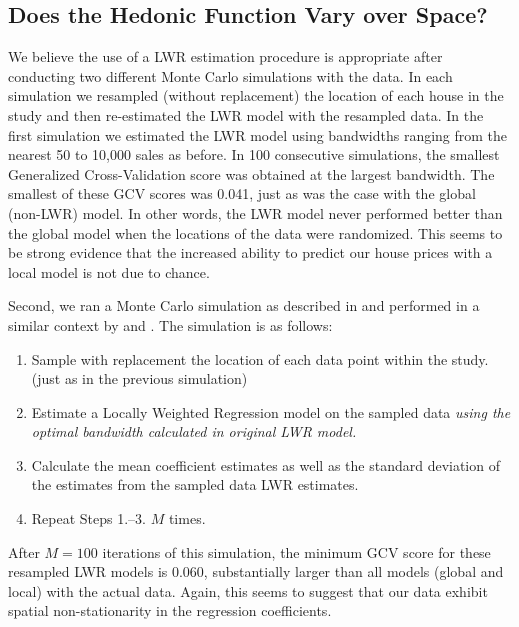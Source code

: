 \documentclass{article}\usepackage{graphicx, color}
\begin{document}
\subsection{Does the Hedonic Function Vary over Space?}


We believe the use of a LWR estimation procedure is appropriate after conducting two different Monte Carlo simulations with the data. In each simulation we resampled (without replacement) the location of each house in the study and then re-estimated the LWR model with the resampled data. In the first simulation we estimated the LWR model using bandwidths ranging from the nearest 50 to 10,000 sales as before. In 100 consecutive simulations, the smallest Generalized Cross-Validation score was obtained at the largest bandwidth. The smallest of these GCV scores was 0.041, just as was the case with the global (non-LWR) model. In other words, the LWR model never performed better than the global model when the locations of the data were randomized. This seems to be strong evidence that the increased ability to predict our house prices with a local model is not due to chance. 

Second, we ran a Monte Carlo simulation as described in \citet{Fotheringham2002} and performed in a similar context by \citet{MarmolejoDuarteCarlos;GonzalezTamez2009} and \citet{Cho2009}. The simulation is as follows:
\begin{enumerate}
\item Sample with replacement the location of each data point within the study. (just as in the previous simulation)
\item Estimate a Locally Weighted Regression model on the sampled data \emph{using the optimal bandwidth calculated in original LWR model.}
\item Calculate the mean coefficient estimates as well as the standard deviation of the estimates from the sampled data LWR estimates.
\item Repeat Steps 1.--3. $M$ times.
\end{enumerate}
After $M = 100$ iterations of this simulation, the minimum GCV score for these resampled LWR models is 0.060, substantially larger than all models (global and local) with the actual data. Again, this seems to suggest that our data exhibit spatial non-stationarity in the regression coefficients.
\end{document}
